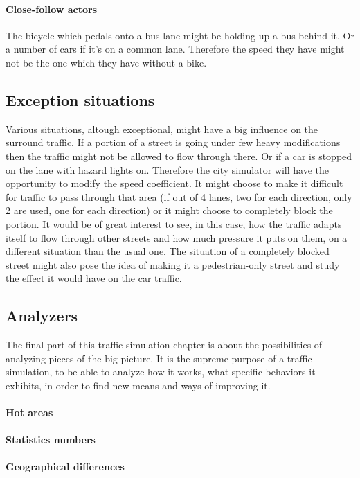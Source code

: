 \documentclass[a4paper,12pt,twoside]{book}
\begin{document}
\paragraph{Close-follow actors}
The bicycle which pedals onto a bus lane might be holding up a bus behind it. Or a number of cars if it's on a common lane. Therefore the speed they have might not be the one which they have without a bike.

\subsection{Exception situations}
Various situations, altough exceptional, might have a big influence on the surround traffic. If a portion of a street is going under few heavy modifications then the traffic might not be allowed to flow through there. Or if a car is stopped on the lane with hazard lights on. Therefore the city simulator will have the opportunity to modify the speed coefficient. It might choose to make it difficult for traffic to pass through that area (if out of 4 lanes, two for each direction, only 2 are used, one for each direction) or it might choose to completely block the portion. It would be of great interest to see, in this case, how the traffic adapts itself to flow through other streets and how much pressure it puts on them, on a different situation than the usual one. The situation of a completely blocked street might also pose the idea of making it a pedestrian-only street and study the effect it would have on the car traffic.

\subsection{Analyzers}

The final part of this traffic simulation chapter is about the possibilities of analyzing pieces of the big picture. It is the supreme purpose of a traffic simulation, to be able to analyze how it works, what specific behaviors it exhibits, in order to find new means and ways of improving it.

\paragraph{Hot areas}

\paragraph{Statistics numbers}

\paragraph{Geographical differences}


\end{document}
